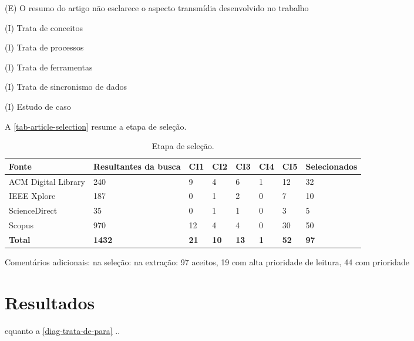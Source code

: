 \documentclass[
article,			%
11pt,				%
oneside,			%
a4paper,			%
english,			%
brazil,				%
sumario=tradicional
]{abntex2}
\begin{document}
  (E) O resumo do artigo não esclarece o aspecto transmídia desenvolvido no trabalho

  (I) Trata de conceitos

  (I) Trata de processos

  (I) Trata de ferramentas

  (I) Trata de sincronismo de dados

  (I) Estudo de caso

  A \autoref{tab-article-selection} resume a etapa de seleção.

  \begin{table}[htb]
    \ABNTEXfontereduzida
    \caption[Etapa de seleção]{Etapa de seleção.}
    \label{tab-article-selection}
    \begin{tabular}{p{3.0cm}|p{2.0cm}|p{1.0cm}|p{1.0cm}|p{1.0cm}|p{1.0cm}|p{1.0cm}|p{2.0cm}}
      \textbf{Fonte} & \textbf{Resultantes da busca} & \textbf{CI1} & \textbf{CI2} & \textbf{CI3} & \textbf{CI4} & \textbf{CI5} & \textbf{Selecionados}  \\
      \hline
      ACM Digital Library & 240 & 9 & 4 & 6 & 1 & 12 & 32 \\
      \hline
      IEEE Xplore & 187 & 0 & 1 & 2 & 0 & 7 & 10 \\
      \hline
      ScienceDirect & 35 & 0 & 1 & 1 & 0 & 3 & 5 \\
      \hline
      Scopus & 970 & 12 & 4 & 4 & 0 & 30 & 50 \\
      \hline
      \textbf{Total} & \textbf{1432} & \textbf{21} & \textbf{10} & \textbf{13} & \textbf{1} & \textbf{52} & \textbf{97} \\
    \end{tabular}
  \end{table}

  Comentários adicionais: na seleção: na extração: 97 aceitos, 19 com alta prioridade de leitura, 44 com prioridade

  \section{Resultados}
  equanto a \autoref{diag-trata-de-para} ..
\end{document}
